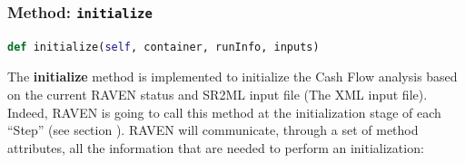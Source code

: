 \subsubsection{Method: \texttt{initialize}}
\label{subsubsec:externalInitializeExternalModelPlugin}
\begin{lstlisting}[language=python]
def initialize(self, container, runInfo, inputs)
\end{lstlisting}

The \textbf{initialize} method is implemented  to initialize the Cash Flow analysis based on
the current RAVEN status and SR2ML input file (The XML input file).
%
 \\Indeed, RAVEN is going to call this method at the initialization stage of each ``Step'' (see section \cite{RAVENuserManual}).
%
RAVEN will communicate, through a set of method attributes, all the information
that are needed to perform an initialization:
